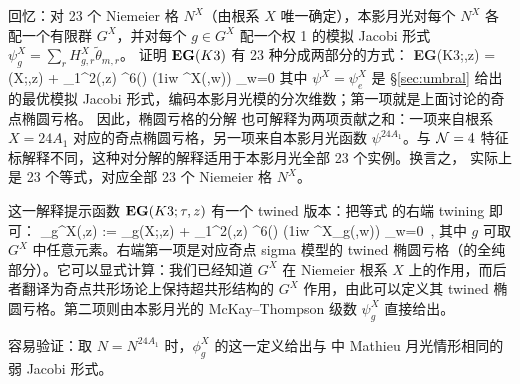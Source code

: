 回忆：对 23 个 Niemeier 格 $N^X$（由根系 $X$ 唯一确定），本影月光对每个 $N^X$ 各配一个有限群 $G^X$，并对每个 $g\in G^X$ 配一个权 1 的模拟 Jacobi 形式 $\psi^X_g = \sum_r H^X_{g,r} \tilde\theta_{m,r}$。\cite{Cheng:2014zpa} 证明 ${\bf EG}(K3)$ 有 23 种分成两部分的方式：
\be\label{um_splitEG}
{\bf EG}(K3;\tau,z) = \eg(X;\tau,z) + {\theta_1^2(\tau,z) \eta^6(\tau)} \left({1\pi i}{\partial\over \partial w} \psi^X(\tau,w)\right) \Big\lvert_{w=0}
\ee 
其中 $\psi^X =\psi^X_e$ 是 \S\ref{sec:umbral} 给出的最优模拟 Jacobi 形式，编码本影月光模的分次维数；第一项就是上面讨论的奇点椭圆亏格。
因此，椭圆亏格的分解  也可解释为两项贡献之和：一项来自根系 $X=24A_1$ 对应的奇点椭圆亏格，另一项来自本影月光函数 $\psi^{24A_1}$。与 ${\cal N}=4$ 特征标解释不同，这种对分解的解释适用于本影月光全部 23 个实例。换言之， 实际上是 23 个等式，对应全部 23 个 Niemeier 格 $N^X$。

这一解释提示函数 ${\bf EG}(K3;\tau,z)$ 有一个 twined 版本：把等式  的右端 twining 即可：
\be\label{um_twining}
\phi_g^{X}(\tau,z) := \eg_g(X;\tau,z) + {\theta_1^2(\tau,z) \over \eta^6(\tau)} \left({1\pi i}{\partial\over \partial w} \psi^X_g(\tau,w)\right) \Big\lvert_{w=0}~,
\ee 
其中 $g$ 可取 $G^X$ 中任意元素。右端第一项是对应奇点 sigma 模型的 twined 椭圆亏格（的全纯部分）。它可以显式计算：我们已经知道 $G^X$ 在 Niemeier 根系 $X$ 上的作用，而后者翻译为奇点共形场论上保持超共形结构的 $G^X$ 作用，由此可以定义其 twined 椭圆亏格。第二项则由本影月光的 McKay--Thompson 级数 $\psi^X_g$ 直接给出。


容易验证：取 $N=N^{24A_1}$ 时，$\phi_g^X$ 的这一定义给出与  中 Mathieu 月光情形相同的弱 Jacobi 形式。


